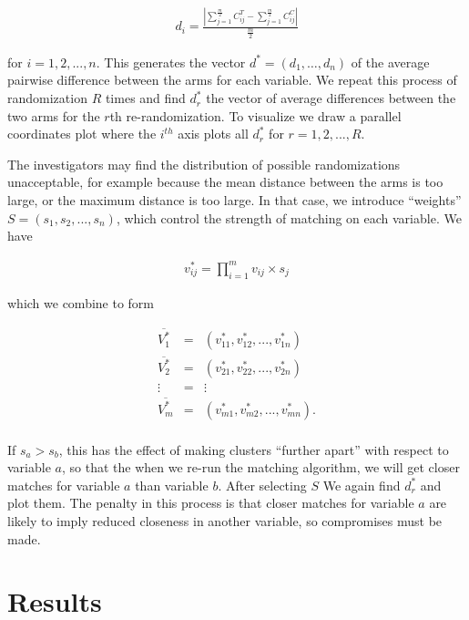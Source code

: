 \documentclass[]{article}
\begin{document}
\begin{eqnarray*}
 d_i = \frac{| \sum_{j = 1}^{\frac{m}{2}}C_{ij}^T - \sum_{j = 1}^{\frac{m}{2}}C_{ij}^C |}{\frac{m}{2}} 
\end{eqnarray*}

for \(i = 1, 2, ..., n.\) This generates the vector
\(d^* = (d_1, \ldots, d_n)\) of the average pairwise difference between
the arms for each variable. We repeat this process of randomization
\(R\) times and find \(d^*_r\) the vector of average differences between
the two arms for the \(r\)th re-randomization. To visualize we draw a
parallel coordinates plot where the \(i^{th}\) axis plots all \(d^*_r\)
for \(r = 1, 2, ..., R.\)

The investigators may find the distribution of possible randomizations
unacceptable, for example because the mean distance between the arms is
too large, or the maximum distance is too large. In that case, we
introduce ``weights'' \(S = (s_{1}, s_{2},..., s_{n})\), which control
the strength of matching on each variable. We have

\begin{eqnarray*}
 v_{ij}^* = \prod_{i=1}^{m} v_{ij} \times s_j
\end{eqnarray*}

which we combine to form

\begin{eqnarray*}
 \overline{V_1^*} & = & (v_{11}^*, v_{12}^*,..., v_{1n}^*) \\
 \overline{V_2^*} & = & (v_{21}^*, v_{22}^*,..., v_{2n}^*) \\
 \vdots & = & \vdots\\    
 \overline{V_m^*} & = & (v_{m1}^*, v_{m2}^*,..., v_{mn}^*) .\\
\end{eqnarray*}

If \(s_a > s_b\), this has the effect of making clusters ``further
apart'' with respect to variable \(a\), so that the when we re-run the
matching algorithm, we will get closer matches for variable \(a\) than
variable \(b\). After selecting \(S\) We again find \(d^*_r\) and plot
them. The penalty in this process is that closer matches for variable
\(a\) are likely to imply reduced closeness in another variable, so
compromises must be made.

\section{Results}\label{results}
\end{document}

